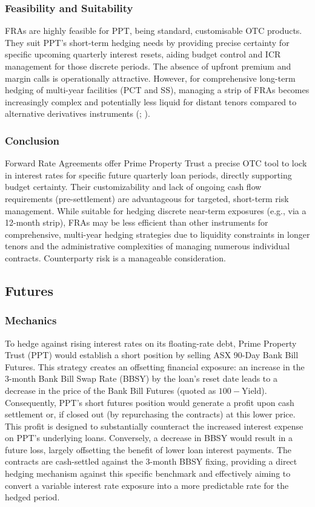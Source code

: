 \documentclass[11pt, a4paper, british]{article}
\begin{document}
\subsubsection{Feasibility and Suitability}
FRAs are highly feasible for PPT, being standard, customisable OTC products. They suit PPT's short-term hedging needs by providing precise certainty for specific upcoming quarterly interest resets, aiding budget control and ICR management for those discrete periods. The absence of upfront premium and margin calls is operationally attractive. However, for comprehensive long-term hedging of multi-year facilities (PCT and SS), managing a strip of FRAs becomes increasingly complex and potentially less liquid for distant tenors compared to alternative derivatives instruments (\cite{fss}; \cite{ss}).

\subsubsection{Conclusion}
Forward Rate Agreements offer Prime Property Trust a precise OTC tool to lock in interest rates for specific future quarterly loan periods, directly supporting budget certainty. Their customizability and lack of ongoing cash flow requirements (pre-settlement) are advantageous for targeted, short-term risk management. While suitable for hedging discrete near-term exposures (e.g., via a 12-month strip), FRAs may be less efficient than other instruments for comprehensive, multi-year hedging strategies due to liquidity constraints in longer tenors and the administrative complexities of managing numerous individual contracts. Counterparty risk is a manageable consideration.


\newpage

\subsection{Futures}

\subsubsection{Mechanics}
To hedge against rising interest rates on its floating-rate debt, Prime Property Trust (PPT) would establish a short position by selling ASX 90-Day Bank Bill Futures. This strategy creates an offsetting financial exposure: an increase in the 3-month Bank Bill Swap Rate (BBSY) by the loan's reset date leads to a decrease in the price of the Bank Bill Futures (quoted as $100 - \text{Yield}$). Consequently, PPT's short futures position would generate a profit upon cash settlement or, if closed out (by repurchasing the contracts) at this lower price. This profit is designed to substantially counteract the increased interest expense on PPT's underlying loans. Conversely, a decrease in BBSY would result in a future loss, largely offsetting the benefit of lower loan interest payments. The contracts are cash-settled against the 3-month BBSY fixing, providing a direct hedging mechanism against this specific benchmark and effectively aiming to convert a variable interest rate exposure into a more predictable rate for the hedged period.
\end{document}
